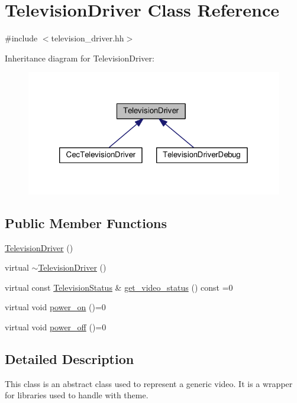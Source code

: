 \hypertarget{classTelevisionDriver}{\section{Television\+Driver Class Reference}
\label{classTelevisionDriver}
}


{\ttfamily \#include $<$television\+\_\+driver.\+hh$>$}



Inheritance diagram for Television\+Driver\+:
\nopagebreak
\begin{figure}[H]
\begin{center}
\leavevmode
\includegraphics[width=320pt]{classTelevisionDriver__inherit__graph}
\end{center}
\end{figure}
\subsection*{Public Member Functions}
\begin{DoxyCompactItemize}
\item 
\hyperlink{classTelevisionDriver_ac0af9a24e93a01169ac6d3e3f7863802}{Television\+Driver} ()
\item 
virtual \hyperlink{classTelevisionDriver_addb7dec34cf34b135dc9da2ae68e2fe6}{$\sim$\+Television\+Driver} ()
\item 
virtual const \hyperlink{structTelevisionStatus}{Television\+Status} \& \hyperlink{classTelevisionDriver_a5dcdc6c2b9c8bab8471080a44ac19f8e}{get\+\_\+video\+\_\+status} () const =0
\item 
virtual void \hyperlink{classTelevisionDriver_a24163794dbfdf4273425b8b13cae0676}{power\+\_\+on} ()=0
\item 
virtual void \hyperlink{classTelevisionDriver_a91298bc5e5c89b2fe2d125f84e111b09}{power\+\_\+off} ()=0
\end{DoxyCompactItemize}


\subsection{Detailed Description}
This class is an abstract class used to represent a generic video. It is a wrapper for libraries used to handle with theme. 

